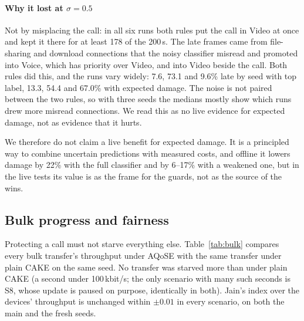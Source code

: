 \documentclass[11pt,a4paper]{article}
\begin{document}
\paragraph{Why it lost at $\sigma = 0.5$} Not by misplacing the call: in all six runs both rules put the call in Video at once and kept it there for at least 178 of the 200\,s. The late frames came from file-sharing and download connections that the noisy classifier misread and promoted into Voice, which has priority over Video, and into Video beside the call. Both rules did this, and the runs vary widely: 7.6, 73.1 and 9.6\% late by seed with top label, 13.3, 54.4 and 67.0\% with expected damage. The noise is not paired between the two rules, so with three seeds the medians mostly show which runs drew more misread connections. We read this as no live evidence for expected damage, not as evidence that it hurts.

We therefore do not claim a live benefit for expected damage. It is a principled way to combine uncertain predictions with measured costs, and offline it lowers damage by 22\% with the full classifier and by 6--17\% with a weakened one, but in the live tests its value is as the frame for the guards, not as the source of the wins.

\subsection{Bulk progress and fairness}
Protecting a call must not starve everything else. Table~\ref{tab:bulk} compares every bulk transfer's throughput under AQoSE with the same transfer under plain CAKE on the same seed. No transfer was starved more than under plain CAKE (a second under 100\,kbit/s; the only scenario with many such seconds is S8, whose update is paused on purpose, identically in both). Jain's index over the devices' throughput is unchanged within $\pm0.01$ in every scenario, on both the main and the fresh seeds.
\end{document}
